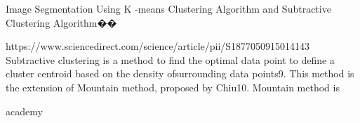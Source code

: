 Image Segmentation Using K -means Clustering Algorithm and Subtractive Clustering Algorithm��{
https://www.sciencedirect.com/science/article/pii/S1877050915014143
Subtractive clustering is a method to find the optimal data point to define a cluster centroid based on the density ofsurrounding data points9. This method is the extension of Mountain method, proposed by Chiu10. Mountain method is

}




academy